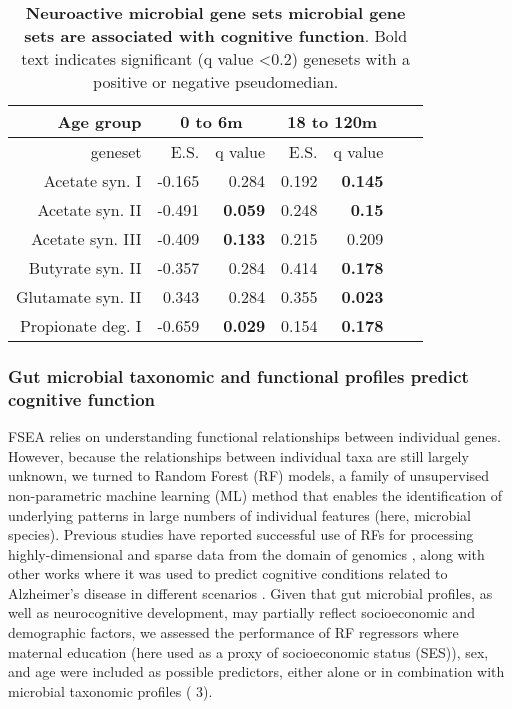\documentclass{article}
\providecommand{\DIFadd}[1]{{\protect\color{blue}\uwave{#1}}} %
\providecommand{\DIFaddbegin}{} %
\providecommand{\DIFaddend}{} %
\newcommand{\DIFaddincludegraphics}[2][]{{\color{blue}\fbox{\DIFOincludegraphics[#1]{#2}}}} %
\DeclareRobustCommand{\DIFaddbegin}{\DIFOaddbegin \let\includegraphics\DIFaddincludegraphics} %
\DeclareRobustCommand{\DIFaddend}{\DIFOaddend \let\includegraphics\DIFOincludegraphics} %
\begin{document}
\begin{table}[!h]
    \begin{center}
    \begin{tabular}{|r|r|r|r|r|r|r|}
        \hline
        \textbf{Age group}& \multicolumn{2}{c|}{\textbf{0 to 6m}} & \multicolumn{2}{c|}{\textbf{18 to 120m}} \\\hline
        geneset & E.S. & q value & E.S. & q value \\\hline
        Acetate syn. I & -0.165 & 0.284 & 0.192 & \textbf{0.145} \\
        Acetate syn. II & -0.491 & \textbf{0.059} & 0.248 & \textbf{0.15} \\
        Acetate syn. III & -0.409 & \textbf{0.133} & 0.215 & 0.209 \\
        Butyrate syn. II & -0.357 & 0.284 & 0.414 & \textbf{0.178} \\
        Glutamate syn. II & 0.343 & 0.284 & 0.355 & \textbf{0.023} \\
        Propionate deg. I & -0.659 & \textbf{0.029} & 0.154 & \textbf{0.178} \\\hline
    \end{tabular}
    \caption{\label{tab:fsea} \textbf{Neuroactive microbial gene sets microbial gene sets are associated with cognitive function}.
    Bold text indicates significant (q value \textless 0.2) genesets with a positive or negative
    pseudomedian.}
    \end{center}
\end{table}
 

\subsubsection*{Gut microbial taxonomic and functional profiles predict \DIFaddbegin \DIFadd{concurrently measured }\DIFaddend cognitive function}

FSEA relies on understanding functional relationships between individual
genes. However, because the relationships between individual taxa are
still largely unknown, we turned to Random Forest (RF) models, a family of 
unsupervised non-parametric machine learning (ML) method that enables
the identification of underlying patterns in large numbers of individual features
(here, microbial species).
Previous studies have reported
successful use of RFs for processing highly-dimensional and sparse data
from the domain of genomics
\cite{amaratungaEnrichedRandomForests2008,brieucPracticalIntroductionRandom2018,chenRandomForestsGenomic2012,franzosaGutMicrobiomeStructure2019,stephanRandomForestApproach2015},
along with other works where it was used
to predict cognitive conditions related to Alzheimer's disease in
different scenarios \cite{ardekaniPredictionIncipientAlzheimer2017,velazquezRandomForestModel2021}.
Given that gut microbial profiles, as well as neurocognitive
development, may partially reflect socioeconomic and demographic
factors, we assessed the performance of RF regressors where maternal
education (here used as a proxy of socioeconomic status (SES)),
sex, and age were included as possible predictors, either alone
or in combination with microbial taxonomic profiles ( \DIFaddbegin \DIFadd{table }\DIFaddend 3).
\end{document}
